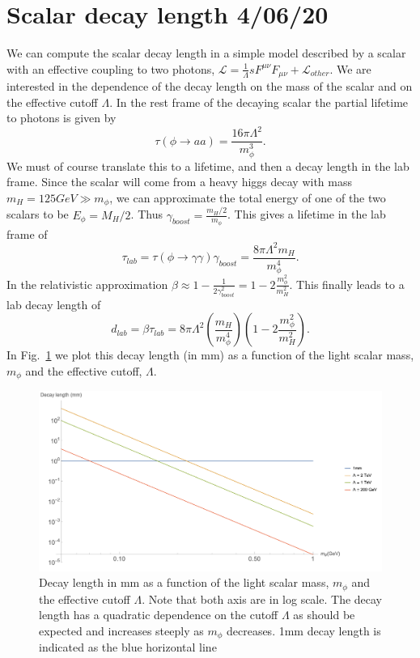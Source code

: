 \documentclass[aps,onecolumn,twoside,secnumarabic,balancelastpage,amsmath,amssymb,nofootinbib,hyperref=pdftex]{revtex4}
\begin{document}
\section{Scalar decay length \tiny{4/06/20}}
We can compute the scalar decay length in a simple model described by a scalar with an effective coupling to two photons, $\mathcal{L} = \frac{1}{\Lambda}sF^{\mu\nu}F_{\mu\nu} + \mathcal{L}_{other}$. We are interested in the dependence of the decay length on the mass of the scalar and on the effective cutoff $\Lambda$. 
\vskip 0.12in
In the rest frame of the decaying scalar the partial lifetime to photons is given by
\begin{equation}
\tau(\phi\rightarrow aa) = \frac{16\pi\Lambda^{2}}{m_{\phi}^{3}}.
\end{equation}
We must of course translate this to a lifetime, and then a decay length in the lab frame. Since the scalar will come from a heavy higgs decay with mass $m_{H} = 125 GeV \gg m_{\phi}$, we can approximate the total energy of one of the two scalars to be $E_{\phi} = M_{H}/2$. Thus $\gamma_{boost} = \frac{m_{H}/2}{m_{\phi}}$. This gives a lifetime in the lab frame of
\begin{equation}
\tau_{lab} = \tau(\phi\rightarrow \gamma\gamma)\gamma_{boost} = \frac{8\pi\Lambda^{2}m_{H}}{m_{\phi}^4}.
\end{equation}
In the relativistic approximation $\beta \approx 1 - \frac{1}{2\gamma_{boost}^{2}} = 1 - 2\frac{m_{\phi}^{2}}{m_{H}^{2}}$. This finally leads to a lab decay length of
\begin{equation}
d_{lab} = \beta\tau_{lab} = 8\pi\Lambda^{2}(\frac{m_{H}}{m_{\phi}^{4}})(1 - 2\frac{m_{\phi}^{2}}{m_{H}^{2}}).
\end{equation}
In Fig.~\ref{fig:3} we plot this decay length (in mm) as a function of the light scalar mass, $m_{\phi}$ and the effective cutoff, $\Lambda$.
\begin{figure}[t]
\begin{center}
\includegraphics[width=14cm]{decay_length_plot.png}
\caption{Decay length in mm as a function of the light scalar mass, $m_{\phi}$ and the effective cutoff $\Lambda$. Note that both axis are in log scale. The decay length has a quadratic dependence on the cutoff $\Lambda$ as should be expected and increases steeply as $m_{\phi}$ decreases. 1mm decay length is indicated as the blue horizontal line}
\label{fig:3}
\end{center}
\end{figure}
\end{document}
